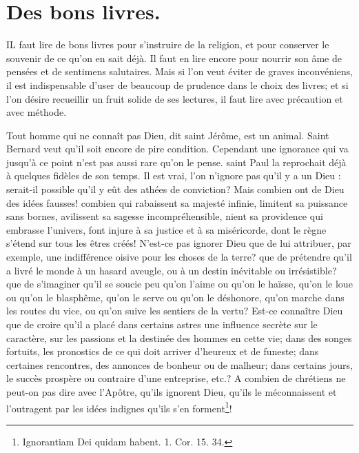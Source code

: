 \documentclass[instructions.tex]{subfiles}
\begin{document}
 
\chapter{Des bons livres.}
 
IL faut lire de bons livres pour s'instruire de la religion, et pour conserver le souvenir de ce qu'on en sait déjà. Il faut en lire encore pour nourrir son âme de pensées et de sentimens salutaires. Mais si l'on veut éviter de graves inconvéniens, il est indispensable d'user de beaucoup de prudence dans le choix des livres; et si l'on désire recueillir un fruit solide de ses lectures, il faut lire avec précaution et avec méthode.
 
\primo Tout homme qui ne connaît pas Dieu, dit saint Jérôme, est un animal. Saint Bernard veut qu'il soit encore de pire condition. Cependant une ignorance qui va jusqu'à ce point n'est pas aussi rare qu'on le pense. saint Paul la reprochait déjà à quelques fidèles de son temps. Il est vrai, l'on n'ignore pas qu'il y a un Dieu : serait-il possible qu'il y eût des athées de conviction? Mais combien ont de Dieu des idées fausses! combien qui rabaissent sa majesté infinie, limitent sa puissance sans bornes, avilissent sa sagesse incompréhensible, nient sa providence qui embrasse l'univers, font injure à sa justice et à sa miséricorde, dont le règne s'étend sur tous les êtres créés! N'est-ce pas ignorer Dieu que de lui attribuer, par exemple, une indifférence oisive pour les choses de la terre? que de prétendre qu'il a livré le monde à un hasard aveugle, ou à un destin inévitable ou irrésistible? que de s'imaginer qu'il se soucie peu qu'on l'aime ou qu'on le haïsse, qu'on le loue ou qu'on le blasphême, qu'on le serve ou qu'on le déshonore, qu'on marche dans les routes du vice, ou qu'on suive les sentiers de la vertu? Est-ce connaître Dieu que de croire qu'il a placé dans certains astres une influence secrète sur le caractère, sur les passions et la destinée des hommes en cette vie; dans des songes fortuits, les pronostics de ce qui doit arriver d'heureux et de funeste; dans certaines rencontres, des annonces de bonheur ou de malheur; dans certains jours, le succès prospère ou contraire d'une entreprise, etc.? A combien de chrétiens ne peut-on pas dire avec l'Apôtre, qu'ils ignorent Dieu, qu'ils le méconnaissent et l'outragent par les idées indignes qu'ils s'en forment\footnote{Ignorantiam Dei quidam habent. 1. Cor. 15. 34.}!
 
\end{document}
